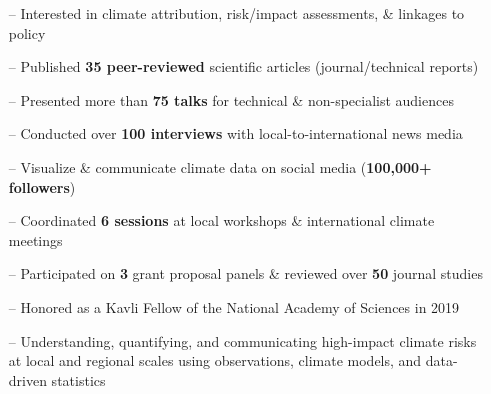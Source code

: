 \documentclass[10pt,letterpaper]{altacv} %
\begin{document}
\tagline{}

%

\begin{fullwidth}
\makecvheader
\end{fullwidth}

%

\vspace{-0.09in}
\begin{itemize}
    \setlength{\itemindent}{0.5em}
    \item[--] \small{Interested in climate attribution, risk\slash impact assessments, \& linkages to policy}
    \item[--] \small{Published \textbf{35 peer-reviewed} scientific articles (journal/technical reports)}
    \item[--] \small{Presented more than \textbf{75 talks} for technical \& non-specialist audiences}
    \item[--] \small{Conducted over \textbf{100 interviews} with local-to-international news media}
    \item[--] \small{Visualize \& communicate climate data on social media (\textbf{100,000+ followers})}
    \item[--] \small{Coordinated \textbf{6 sessions} at local workshops \& international climate meetings}
    \item[--] \small{Participated on \textbf{3} grant proposal panels \& reviewed over \textbf{50} journal studies}    
    \item[--] \small{Honored as a Kavli Fellow of the National Academy of Sciences in 2019}
\end{itemize}
\smallskip

\vspace*{-0.2cm}

\begin{itemize}
\item[--] \small{Understanding, quantifying, and communicating high-impact climate risks at local and regional scales using observations, climate models, and data-driven statistics}
\end{itemize}
\medskip
\end{document}
